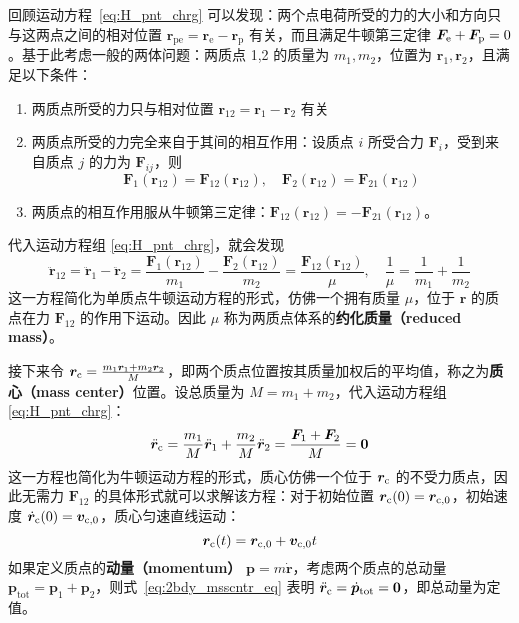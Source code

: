 \documentclass[cn,10pt,math=newtx,citestyle=gb7714-2015,bibstyle=gb7714-2015]{elegantbook}
\def\bm{\boldsymbol}
\begin{document}
回顾运动方程~\ref{eq:H_pnt_chrg} 可以发现：两个点电荷所受的力的大小和方向只与这两点之间的相对位置 $\bm r_\text{pe} =\bm r_\text{e}-\bm r_\text{p}$ 有关，而且满足牛顿第三定律 $\bm F_\text e+\bm F_\text p=0$。基于此考虑一般的两体问题：两质点 1,2 的质量为 $m_1,m_2$，位置为 $\bm r_1,\bm r_2$，且满足以下条件：
\begin{enumerate}
    \item 两质点所受的力只与相对位置 $\bm r_{12}=\bm r_1-\bm r_2$ 有关
    \item 两质点所受的力完全来自于其间的相互作用：设质点 $i$ 所受合力 $\bm F_i$，受到来自质点 $j$ 的力为 $\bm F_{ij}$，则
    \begin{equation*}
        \bm F_1(\bm r_{12}) = \bm F_{12}(\bm r_{12}),\quad \bm F_2(\bm r_{12}) = \bm F_{21}(\bm r_{12})
    \end{equation*}
    \item 两质点的相互作用服从牛顿第三定律：$\bm F_{12}(\bm r_{12}) = -\bm F_{21}(\bm r_{12})$。
\end{enumerate}
代入运动方程组 \ref{eq:H_pnt_chrg}，就会发现
\begin{equation}\label{eq:2bdy_rltv}
    \ddot{\bm r}_{12} = \ddot{\bm r}_1 - \ddot{\bm r}_2 = \frac{\bm F_1(\bm r_{12})}{m_1} - \frac{\bm F_2(\bm r_{12})}{m_2} = \frac{\bm F_{12}(\bm r_{12})}{\mu},\quad \frac{1}{\mu} = \frac{1}{m_1} + \frac{1}{m_2}
\end{equation}
这一方程简化为单质点牛顿运动方程的形式，仿佛一个拥有质量 $\mu$，位于 $\bm r$ 的质点在力 $\bm F_{12}$ 的作用下运动。因此 $\mu$ 称为两质点体系的\textbf{约化质量（reduced mass）}。

接下来令 $\bm r_\text c=\frac{m_1\bm r_1+m_2\bm r_2}{M}$，即两个质点位置按其质量加权后的平均值，称之为\textbf{质心（mass center）}位置。设总质量为 $M=m_1+m_2$，代入运动方程组 \ref{eq:H_pnt_chrg}：
\begin{equation}\label{eq:2bdy_msscntr_eq}
    \ddot{\bm r}_\text c = \frac{m_1}{M}\ddot{\bm r}_1+\frac{m_2}{M}\ddot{\bm r}_2 = \frac{\bm F_1+\bm F_2}{M}=\bm 0
\end{equation}
这一方程也简化为牛顿运动方程的形式，质心仿佛一个位于 $\bm r_\text c$ 的不受力质点，因此无需力 $\bm F_{12}$ 的具体形式就可以求解该方程：对于初始位置 $\bm r_\text c(0)=\bm r_{\text c,0}$，初始速度 $\dot{\bm r}_\text c(0)=\bm v_{\text c,0}$，质心匀速直线运动：
\begin{equation}\label{eq:2bdy_msscntr}
    \bm r_\text c(t)=\bm r_{\text c,0}+\bm v_{\text c,0}t
\end{equation}
如果定义质点的\textbf{动量（momentum）} $\bm p=m\dot{\bm r}$，考虑两个质点的总动量 $\bm p_\text{tot}=\bm p_1+\bm p_2$，则式~\ref{eq:2bdy_msscntr_eq} 表明 $\ddot{\bm r}_\text c=\dot{\bm p}_\text{tot}=\bm 0$，即总动量为定值。
\end{document}
